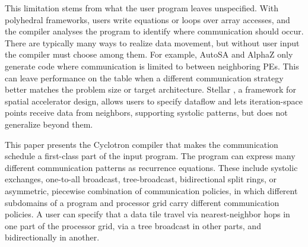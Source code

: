 \documentclass[sigplan, nonacm]{acmart}
\begin{document}
This limitation stems from what the user program leaves unspecified. With polyhedral frameworks, users write equations or loops over array accesses, and the compiler analyses the program to identify where communication should occur. There are typically many ways  to realize data movement, but without user input the compiler must choose among them. For example, AutoSA and AlphaZ only generate code where communication is limited to between neighboring PEs. This can leave performance on the table when a different communication strategy better matches the problem size or target architecture. Stellar \citep{genc2024stellar}, a framework for spatial accelerator design, allows users to specify dataflow and lets iteration-space points receive data from neighbors, supporting systolic patterns, but does not generalize beyond them.


This paper presents the Cyclotron compiler that makes the communication schedule
a first-class part of the input program. The program can express many different communication patterns as recurrence equations. These include systolic exchanges, one-to-all broadcast, tree-broadcast, bidirectional split rings, or asymmetric, piecewise combination of communication policies, in which different subdomains of a program and processor grid carry different communication policies. A user can specify that a data tile travel via nearest-neighbor hops in one part of the processor grid, via a tree broadcast in other parts, and bidirectionally in another.
\end{document}
